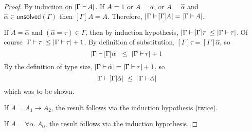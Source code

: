 \documentclass[a4paper]{article}
\newcommand{\arr}{\rightarrow}
\def\CompactJudgments{0}
\newcommand{\entails}{\mathrel{\ifnum\CompactJudgments=1\vdash \else \vdash\,\fi}}
\newcommand{\tyname}[1]{\textsf{\normalfont #1}}
\newcommand{\unitty}{\tyname{1}}
\newcommand{\xunsolved}{\mathsf{unsolved}}
\newcommand{\unsolved}[1]{\xunsolved(#1)}
\newcommand{\AllSym}{\forall}
\newcommand{\xAll}[1]{\AllSym#1}
\newcommand{\All}[1]{\xAll{#1}.\:}
\newcommand{\hypeq}[2]{{#1} = {#2}}
\newcommand{\alltype}[1]{\All{#1}}
\newcommand{\typesize}[2]{|{#1} {\;\entails} {#2}|}
\newcommand{\ahat}{\hat{\alpha}}
\begin{document}
\typesizesubst*
\begin{proof}  By induction on $\typesize{\Gamma}{A}$.
  If $A = \unitty$ or $A = \alpha$, or $A = \ahat$ and $\ahat \in \unsolved{\Gamma}$
  then $[\Gamma]A = A$. 
  Therefore, $\typesize{\Gamma}{[\Gamma]A} = \typesize{\Gamma}{A}$.

  If $A = \ahat$ and $(\hypeq{\ahat}{\tau}) \in \Gamma$, then
  by induction hypothesis, $\typesize{\Gamma}{[\Gamma]\tau} \leq \typesize{\Gamma}{\tau}$.
  Of course $\typesize{\Gamma}{\tau} \leq \typesize{\Gamma}{\tau} + 1$.
  By definition of substitution, $[\Gamma]\tau = [\Gamma]\ahat$, so
  \[
      \typesize{\Gamma}{[\Gamma]\ahat} ~\leq~ \typesize{\Gamma}{\tau} + 1
   \]
  By the definition of type size, $\typesize{\Gamma}{\ahat} = \typesize{\Gamma}{\tau} + 1$, so
  \[
      \typesize{\Gamma}{[\Gamma]\ahat} ~\leq~ \typesize{\Gamma}{\ahat}
   \]
   which was to be shown.

  If $A = A_1 \arr A_2$, the result follows via the induction hypothesis (twice).
  
  If $A = \alltype{\alpha}{A_0}$, the result follows via the induction hypothesis.
\end{proof}
\end{document}
